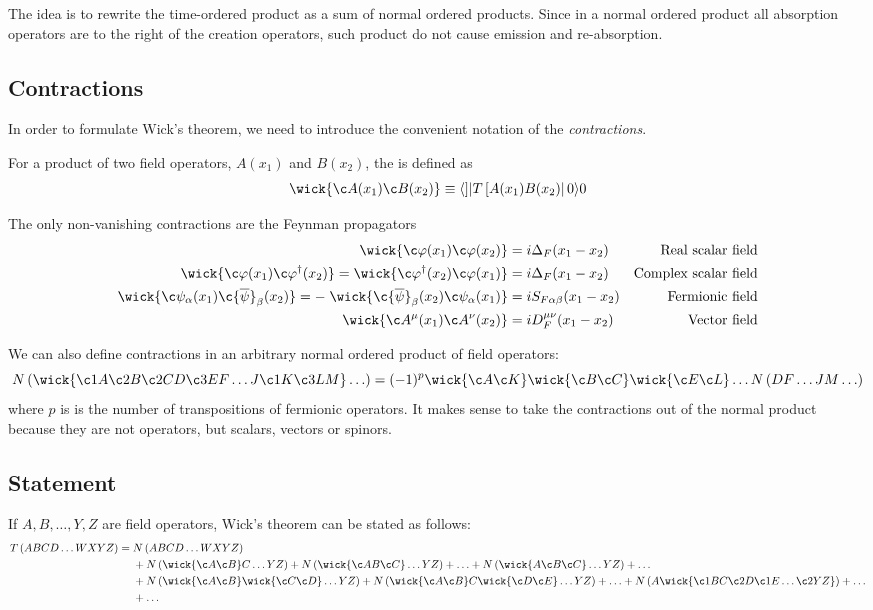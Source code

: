 The idea is to rewrite the time-ordered product as a sum of normal ordered products. Since in a normal ordered product all absorption operators are to the right of the creation operators, such product do not cause emission and re-absorption.

\subsection{Contractions}
In order to formulate Wick's theorem, we need to introduce the convenient notation of the \textit{contractions}.

For a product of two field operators, $A(x_1)$ and $B(x_2)$, the  is defined as
\[ \wick{\c A(x_1) \c B(x_2)} \equiv \braket[T\left[A(x_1)B(x_2)\right]]{0}{0} \]

The only non-vanishing contractions are the Feynman propagators
\begin{align*}
\wick{\c\varphi(x_1)\c\varphi(x_2)} &= i \Delta_F(x_1 - x_2) & \text{Real scalar field} \\
\wick{\c\varphi(x_1)\c\varphi^\dagger(x_2)} = \wick{\c\varphi^\dagger(x_2)\c\varphi(x_1)} &= i \Delta_F(x_1 - x_2) & \text{Complex scalar field} \\
\wick{\c\psi_\alpha(x_1)\c{\overline{\psi}}_\beta(x_2)} = - \;\wick{\c{\overline{\psi}}_\beta(x_2)\c\psi_\alpha(x_1)} &= i S_{F\alpha\beta}(x_1 - x_2) & \text{Fermionic field} \\
\wick{\c A^\mu(x_1)\c A^\nu(x_2)} &= iD_F^{\mu\nu}(x_1 - x_2) & \text{Vector field}
\end{align*}

We can also define contractions in an arbitrary normal ordered product of field operators:
\[ N\left(\wick{\c1 A \c2 B \c2 C D \c3 E F \ldots J \c1 K \c3 L M} \ldots \right) = (-1)^p\wick{\c A \c K} \wick{\c B \c C} \wick{\c E \c L} \ldots N\left( DF\ldots JM \ldots \right) \]
where $p$ is is the number of transpositions of fermionic operators. It makes sense to take the contractions out of the normal product because they are not operators, but scalars, vectors or spinors.

\subsection{Statement}
If $A, B, \ldots , Y, Z$ are field operators, Wick's theorem can be stated as follows:
\begin{align*}
T\left(ABCD \ldots WXYZ\right) = \;&N\left(ABCD \ldots WXYZ\right) \\
&+ N\left(\wick{\c A \c B}C \ldots YZ\right) + N\left(\wick{\c A B \c C} \ldots YZ\right) + \ldots + N\left(\wick{A \c B \c C} \ldots YZ\right) + \ldots \\
&+ N\left(\wick{\c A \c B}\wick{\c C \c D} \ldots YZ\right) + N\left(\wick{\c A \c B}C\wick{\c D \c E} \ldots YZ\right) + \ldots + N\left(A\wick{\c1 B C \c2 D \c1 E \ldots  \c2 Y Z}\right) + \ldots \\
&+ \ldots
\end{align*}

